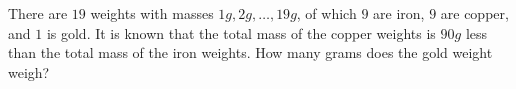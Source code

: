 There are $19$ weights with masses $1g, 2g, \ldots, 19g$, of which $9$ are iron, $9$ are copper, and $1$ is gold. It is known that the total mass of the copper weights is $90g$ less than the total mass of the iron weights. How many grams does the gold weight weigh?
